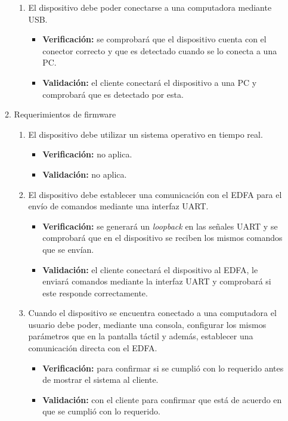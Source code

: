 \documentclass[
11pt, %
codirector, %
]{charter}
\begin{document}
\begin{enumerate}
\begin{enumerate}
\begin{enumerate}[label*=\arabic*.]
\item El dispositivo debe poder conectarse a una computadora mediante USB.
\begin{itemize}
	\item \textbf{Verificación:} se comprobará que el dispositivo cuenta con el conector correcto y que es detectado cuando se lo conecta a una PC.
	\item \textbf{Validación:} el cliente conectará el dispositivo a una PC y comprobará que es detectado por esta.
\end{itemize}

\end{enumerate}

\item Requerimientos de firmware
\begin{enumerate}[label*=\arabic*.]
\item El dispositivo debe utilizar un sistema operativo en tiempo real.
\begin{itemize}
	\item \textbf{Verificación:} no aplica.
	\item \textbf{Validación:} no aplica.
\end{itemize}

\item El dispositivo debe establecer una comunicación con el EDFA para el envío de comandos mediante una interfaz UART.
\begin{itemize}
	\item \textbf{Verificación:} se generará un \textit{loopback} en las señales UART y se comprobará que en el dispositivo se reciben los mismos comandos que se envían.
	\item \textbf{Validación:} el cliente conectará el dispositivo al EDFA, le enviará comandos mediante la interfaz UART y comprobará si este responde correctamente.
\end{itemize}

\item Cuando el dispositivo se encuentra conectado a una computadora el usuario debe poder, mediante una consola, configurar los mismos parámetros que en la pantalla táctil y además, establecer una comunicación directa con el EDFA.
\begin{itemize}
	\item \textbf{Verificación:} para confirmar si se cumplió con lo requerido antes de mostrar el sistema al cliente.
	\item \textbf{Validación:} con el cliente para confirmar que está de acuerdo en que se cumplió con lo requerido.
\end{itemize}


\end{enumerate}
\end{enumerate}
\end{enumerate}
\end{document}
